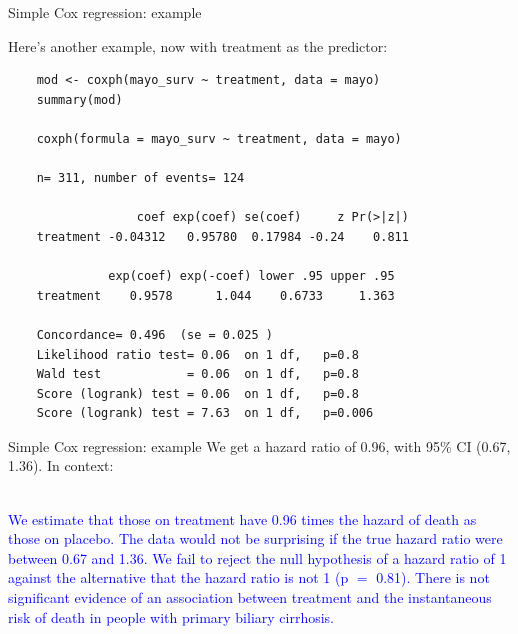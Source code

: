 \documentclass[10pt,t]{beamer}
\begin{document}
\begin{frame}[fragile]{Simple Cox regression: example}
	
	
	\vspace{-3 mm}
	
	Here's another example, now with treatment as the predictor:
	
	\footnotesize
	\begin{verbatim}
	mod <- coxph(mayo_surv ~ treatment, data = mayo)
	summary(mod)
	
	coxph(formula = mayo_surv ~ treatment, data = mayo)
	
	n= 311, number of events= 124 
	
	              coef exp(coef) se(coef)     z Pr(>|z|)
	treatment -0.04312   0.95780  0.17984 -0.24    0.811
	
	          exp(coef) exp(-coef) lower .95 upper .95
	treatment    0.9578      1.044    0.6733     1.363
	
	Concordance= 0.496  (se = 0.025 )
	Likelihood ratio test= 0.06  on 1 df,   p=0.8
	Wald test            = 0.06  on 1 df,   p=0.8
	Score (logrank) test = 0.06  on 1 df,   p=0.8
	Score (logrank) test = 7.63  on 1 df,   p=0.006
	\end{verbatim}
	
\end{frame}

\begin{frame}{Simple Cox regression: example}
	We get a hazard ratio of 0.96, with 95\% CI (0.67, 1.36). In context:
	\\ ~\ 
	
	\textcolor{blue}{We estimate that those on treatment have 0.96 times the hazard of death as those on placebo. The data would not be surprising if the true hazard ratio were between 0.67 and 1.36. We fail to reject the null hypothesis of a hazard ratio of 1 against the alternative that the hazard ratio is not 1 (p $=$ 0.81). There is not significant evidence of an association between treatment and the instantaneous risk of death in people with primary biliary cirrhosis.}
\end{frame}
\end{document}

